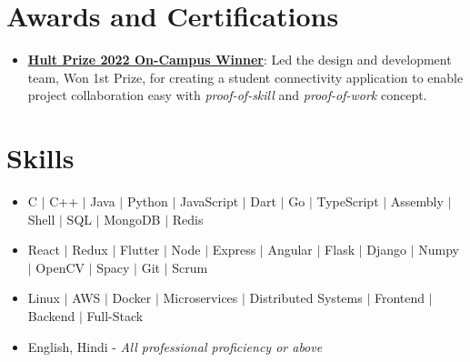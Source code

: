 \documentclass[letterpaper,11pt]{article}
\newcommand{\resumeItem}[1]{
  \item\small{
    {#1 \vspace{-2pt}}
  }
}
\newcommand{\resumeItemListStart}{\begin{itemize}}
\newcommand{\resumeItemListEnd}{\end{itemize}\vspace{-5pt}}
\begin{document}
\section{Awards and Certifications}
 \begin{itemize}[leftmargin=0.15in, label={}]
    \small{\item{
        \resumeItemListStart
            \resumeItem{\textbf{\href{https://www.linkedin.com/posts/dshekhar17_hultprize2022-hultprizekiit-kiituniversity-activity-6899007358467743746-6hZ3}{Hult Prize 2022 On-Campus Winner}}: Led the design and development team, Won 1st Prize, for creating a student connectivity application to enable project collaboration easy with \textit{proof-of-skill} and \textit{proof-of-work} concept.}
            
      \resumeItemListEnd
    }}
 \end{itemize}

%

\section{Skills}
    \begin{itemize}[leftmargin=0.15in, label={}]
        \small{\item{
            \resumeItemListStart
                \resumeItem{ C $|$ C++ $|$ Java $|$ Python $|$ JavaScript $|$ Dart $|$ Go $|$ TypeScript $|$ Assembly $|$ Shell $|$ SQL $|$ MongoDB $|$ Redis}
                \resumeItem{ React $|$ Redux $|$ Flutter $|$ Node $|$ Express $|$ Angular $|$ Flask $|$ Django $|$ Numpy $|$ OpenCV $|$ Spacy $|$ Git $|$ Scrum}
                \resumeItem{ Linux $|$ AWS $|$ Docker $|$ Microservices $|$ Distributed Systems $|$ Frontend $|$ Backend $|$ Full-Stack}
                \resumeItem{ English, Hindi - \textit{All professional proficiency or above}}
            \resumeItemListEnd
        }}
    \end{itemize}
 
\end{document}
